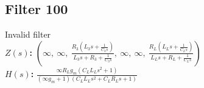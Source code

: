 \documentclass{article}
\begin{document}
\subsection*{Filter 100}
Invalid filter \\ 
\textbf{$Z(s)$:} $\left( \infty, \  \infty, \  \frac{R_{3} \left(L_{3} s + \frac{1}{C_{3} s}\right)}{L_{3} s + R_{3} + \frac{1}{C_{3} s}}, \  \infty, \  \infty, \  \frac{R_{L} \left(L_{L} s + \frac{1}{C_{L} s}\right)}{L_{L} s + R_{L} + \frac{1}{C_{L} s}}\right)$ \\ 
\textbf{$H(s)$:} $\frac{\infty R_{L} g_{m} \left(C_{L} L_{L} s^{2} + 1\right)}{\left(\infty g_{m} + 1\right) \left(C_{L} L_{L} s^{2} + C_{L} R_{L} s + 1\right)}$ \\ 
\end{document}
